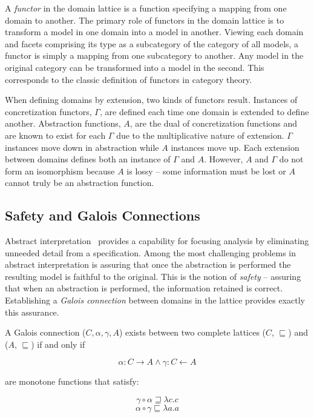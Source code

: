 \documentclass[12pt]{article}
\begin{document}
A \emph{functor} in the domain lattice is a function specifying a
mapping from one domain to another.  The primary role of functors in
the domain lattice is to transform a model in one domain into a model
in another.  Viewing each domain and facets comprising its type as a
subcategory of the category of all models, a functor is simply a
mapping from one subcategory to another.  Any model in the original
category can be transformed into a model in the second.  This
corresponds to the classic definition of functors in category theory.

When defining domains by extension, two kinds of functors result.
Instances of concretization functors, $\Gamma$, are defined each time
one domain is extended to define another.  Abstraction functions, $A$,
are the dual of concretization functions and are known to exist for
each $\Gamma$ due to the multiplicative nature of extension.  $\Gamma$
instances move down in abstraction while $A$ instances move up.  Each
extension between domains defines both an instance of $\Gamma$ and
$A$.  However, $A$ and $\Gamma$ do not form an isomorphism because $A$
is lossy -- some information must be lost or $A$ cannot truly be an
abstraction function.

\subsection{Safety and Galois Connections}

Abstract interpretation~\cite{Cousot:00:Abstract-Interp} provides a
capability for focusing analysis by eliminating unneeded detail from a
specification.  Among the most challenging problems in abstract
interpretation is assuring that once the abstraction is performed the
resulting model is faithful to the original. This is the notion of
\emph{safety} -- assuring that when an abstraction is performed, the
information retained is correct.  Establishing a \emph{Galois
  connection} \cite{Nielson:05:Principles-of-P} between domains in the
lattice provides exactly this assurance.

A Galois connection ($C,\alpha,\gamma,A$) exists between two complete
lattices ($C$, $\sqsubseteq$) and ($A$, $\sqsubseteq$) if and only if

\[\alpha:C \rightarrow A \wedge \gamma:C \leftarrow A\]

\noindent are monotone functions that satisfy:

\begin{equation}
\label{eq:c1}
\gamma \circ \alpha \sqsupseteq \lambda c.c
\end{equation}
\begin{equation}
\label{eq:c2}
\alpha \circ \gamma \sqsubseteq \lambda a.a
\end{equation}
\end{document}
